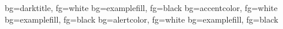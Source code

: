          {bg=darktitle,   fg=white}
          {bg=examplefill, fg=black}
 {bg=accentcolor, fg=white}
  {bg=examplefill, fg=black}
 {bg=alertcolor,  fg=white}
  {bg=examplefill, fg=black}
